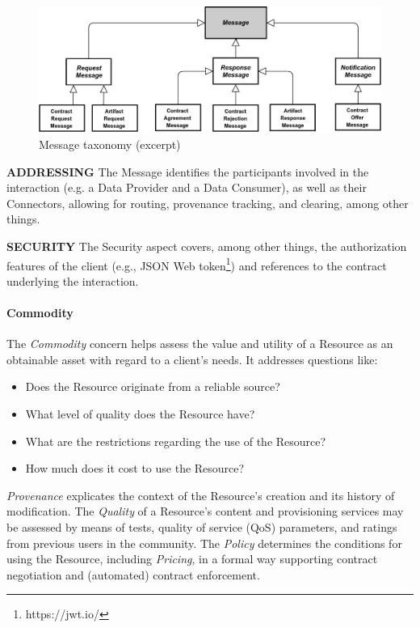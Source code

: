 
\begin{figure}[H]
	\begin{Center}
		\includegraphics[width=4.5in,height=1.65in]{./media/image42.png}
		\caption{Message taxonomy (excerpt)}
		\label{fig:Message_taxonomy_excerpt}
	\end{Center}
\end{figure}




\textbf{ADDRESSING }The Message identifies the participants involved in the interaction (e.g. a Data Provider and a Data Consumer), as well as their Connectors, allowing for routing, provenance tracking, and clearing, among other things.

\textbf{SECURITY} The Security aspect covers, among other things, the authorization features of the client (e.g., JSON Web token\footnote{https://jwt.io/ }) and references to the contract underlying the interaction. 

\paragraph{Commodity\\}


The \textit{Commodity} concern helps assess the value and utility of a Resource as an obtainable asset with regard to a client’s needs. It addresses questions like:
 \begin{itemize}
	\item Does the Resource originate from a reliable source? 
 	\item What level of quality does the Resource have? 
 	\item What are the restrictions regarding the use of the Resource? 
 	\item How much does it cost to use the Resource?
\end{itemize} 
 \textit{Provenance} explicates the context of the Resource’s creation and its history of modification. The \textit{Quality} of a Resource’s content and provisioning services may be assessed by means of tests, quality of service (QoS) parameters, and ratings from previous users in the community. The \textit{Policy }determines the conditions for using the Resource, including \textit{Pricing}, in a formal way supporting contract negotiation and (automated) contract enforcement. 

